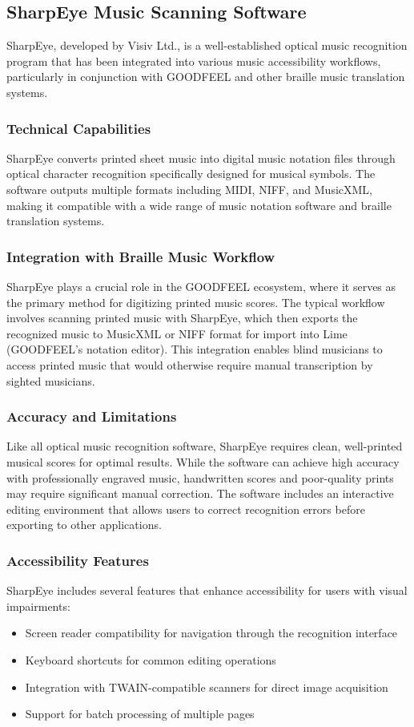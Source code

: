 \subsection{SharpEye Music Scanning Software}

SharpEye, developed by Visiv Ltd., is a well-established optical music recognition program that has been integrated into various music accessibility workflows, particularly in conjunction with GOODFEEL and other braille music translation systems.

\subsubsection{Technical Capabilities}
SharpEye converts printed sheet music into digital music notation files through optical character recognition specifically designed for musical symbols. The software outputs multiple formats including MIDI, NIFF, and MusicXML, making it compatible with a wide range of music notation software and braille translation systems.

\subsubsection{Integration with Braille Music Workflow}
SharpEye plays a crucial role in the GOODFEEL ecosystem, where it serves as the primary method for digitizing printed music scores. The typical workflow involves scanning printed music with SharpEye, which then exports the recognized music to MusicXML or NIFF format for import into Lime (GOODFEEL's notation editor). This integration enables blind musicians to access printed music that would otherwise require manual transcription by sighted musicians.

\subsubsection{Accuracy and Limitations}
Like all optical music recognition software, SharpEye requires clean, well-printed musical scores for optimal results. While the software can achieve high accuracy with professionally engraved music, handwritten scores and poor-quality prints may require significant manual correction. The software includes an interactive editing environment that allows users to correct recognition errors before exporting to other applications.

\subsubsection{Accessibility Features}
SharpEye includes several features that enhance accessibility for users with visual impairments:
\begin{itemize}
    \item Screen reader compatibility for navigation through the recognition interface
    \item Keyboard shortcuts for common editing operations
    \item Integration with TWAIN-compatible scanners for direct image acquisition
    \item Support for batch processing of multiple pages
\end{itemize}

